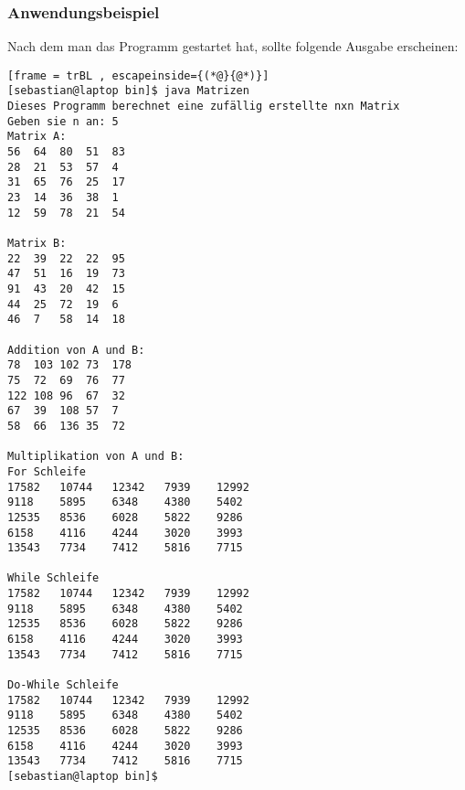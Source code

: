 \subsubsection{Anwendungsbeispiel}
Nach dem man das Programm gestartet hat, sollte folgende Ausgabe erscheinen:
\begin{lstlisting}[frame = trBL , escapeinside={(*@}{@*)}]
[sebastian@laptop bin]$ java Matrizen 
Dieses Programm berechnet eine zufällig erstellte nxn Matrix
Geben sie n an: 5
Matrix A:
56	64	80	51	83	
28	21	53	57	4	
31	65	76	25	17	
23	14	36	38	1	
12	59	78	21	54	

Matrix B:
22	39	22	22	95	
47	51	16	19	73	
91	43	20	42	15	
44	25	72	19	6	
46	7	58	14	18	

Addition von A und B:
78	103	102	73	178	
75	72	69	76	77	
122	108	96	67	32	
67	39	108	57	7	
58	66	136	35	72	

Multiplikation von A und B:
For Schleife
17582	10744	12342	7939	12992	
9118	5895	6348	4380	5402	
12535	8536	6028	5822	9286	
6158	4116	4244	3020	3993	
13543	7734	7412	5816	7715	

While Schleife
17582	10744	12342	7939	12992	
9118	5895	6348	4380	5402	
12535	8536	6028	5822	9286	
6158	4116	4244	3020	3993	
13543	7734	7412	5816	7715	

Do-While Schleife
17582	10744	12342	7939	12992	
9118	5895	6348	4380	5402	
12535	8536	6028	5822	9286	
6158	4116	4244	3020	3993	
13543	7734	7412	5816	7715	
[sebastian@laptop bin]$ 
\end{lstlisting}